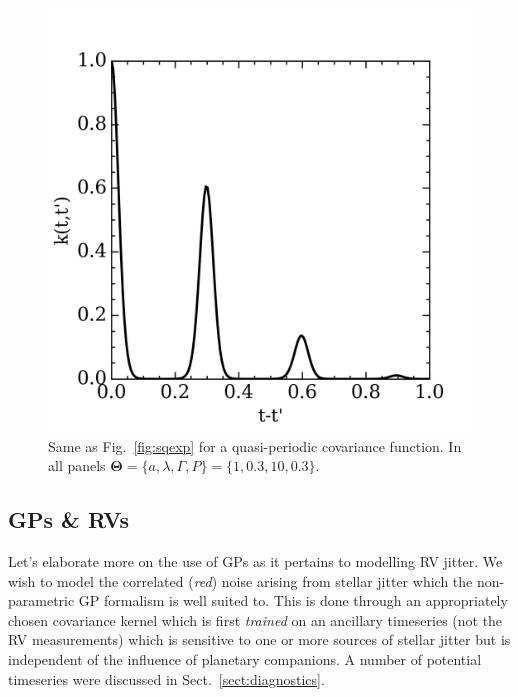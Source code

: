 \begin{figure}
\includegraphics[scale=.4]{figures/kernel_qper.png}
\caption{Same as Fig.~\ref{fig:sqexp} for a quasi-periodic covariance function. 
In all panels $\mathbf{\Theta} = \{a, \lambda, \Gamma, P \}= \{1, 0.3, 10, 0.3 \}$.
\label{fig:QP}}
\end{figure}

\subsection{GPs \& RVs} \label{sect:gprv}
Let's elaborate more on the use of GPs as it pertains to modelling RV jitter. 
We wish to model the correlated (\emph{red}) noise arising from stellar jitter 
which the non-parametric GP formalism is well suited to. This is done 
through an appropriately chosen covariance kernel which is first 
\emph{trained} on 
an ancillary timeseries (not the RV measurements) which is sensitive to 
one or more sources of stellar jitter but is independent of the 
influence of planetary companions. A number of potential timeseries were 
discussed in Sect.~\ref{sect:diagnostics}. \\

